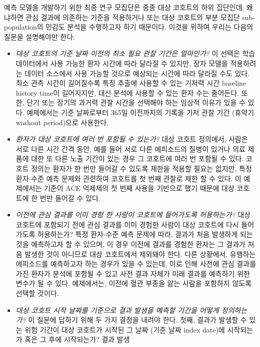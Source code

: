 \documentclass[10.5pt]{book}
\theoremstyle{definition}
\theoremstyle{definition}
\theoremstyle{definition}
\theoremstyle{remark}
\begin{document}
예측 모델을 개발하기 위한 최종 연구 모집단은 종종 대상 코호트의 하위
집단인데, 왜냐하면 관심 결과에 의존하는 기준을 적용하거나 또는 대상
코호트의 부분 모집단 sub-population의 민감도 분석을 수행하고자 하기
때문이다. 이것을 위하여 우리는 다음의 질문을 설명해야만 한다:

\begin{itemize}
\item
  \emph{대상 코호트의 기준 날짜 이전의 최소 필요 관찰 기간은 얼마인가?}
  이 선택은 학습 데이터에서 사용 가능한 환자 시간에 따라 달라질 수
  있지만, 장차 모델을 적용하려는 데이터 소스에서 사용 가능할 것으로
  예상되는 시간에 따라 달라질 수도 있다. 최소 관측 시간이 길어질수록
  특징 추출에 사용할 수 있는 기저력 시간 baseline history time이
  길어지지만, 대신 분석에 사용할 수 있는 환자 수는 줄어든다. 또한, 단기
  또는 장기의 과거력 관찰 시간을 선택해야 하는 임상적 이유가 있을 수
  있다. 예제에서는 기준 날짜로부터 365일 이전까지의 기록을 기저 관찰
  기간 (휴약기 washout period)으로 사용한다.
\item
  \emph{환자가 대상 코호트에 여러 번 포함될 수 있는가?} 대상 코호트
  정의에서, 사람은 서로 다른 시간 간격 동안, 예를 들어 서로 다른
  에피소드의 질병이 있거나 의료 제품에 대한 또 다른 노출 기간이 있는
  경우 그 코호트에 여러 번 포함될 수 있다. 코호트 정의는 환자가 한 번만
  들어갈 수 있도록 제한을 적용할 필요는 없지만, 특정 환자-수준 예측
  문제와 관련하여 코호트를 첫 번째 관찰로 제한 할 수 있다. 이 예제에서는
  기준이 ACE 억제제의 첫 번째 사용을 기반으로 했기 때문에 대상 코호트에
  한 번만 들어갈 수 있다.
\item
  \emph{이전에 관심 결과를 이미 경험 한 사람이 코호트에 들어가도록
  허용하는가?} 대상 코호트에 포함되기 전에 관심 결과를 이미 경험한
  사람이 대상 코호트에 다시 들어가도록 허용하는가? 특정 환자-수준 예측
  문제에 따라, 결과가 처음 발생하게 되는 것을 예측하고자 할 수 있으며,
  이 경우 이전에 결과를 경험한 환자는 그 결과가 처음 발생한 것이
  아니므로 대상 코호트에서 제외돼야 한다. 다른 상황에서, 유행하는
  에피소드를 예측하고자 하는 경우가 있을 수 있는데, 이로 인해 사전에
  관심 결과를 가진 환자가 분석에 포함될 수 있고 사전 결과 자체가 미래
  결과를 예측하기 위한 변수가 될 수 있다. 예제에서는, 이전에 혈관 부종을
  앓는 사람을 포함하지 않도록 선택할 것이다.
\item
  \emph{대상 코호트 시작 날짜를 기준으로 결과 발생을 예측할 기간을
  어떻게 정의하는가?} 이 질문에 답하기 위해 두 가지 결정을 내려야 한다.
  첫째, 결과가 발생할 수 있는 위험 기간이 대상 코호트가 시작된 그 날짜
  (기준 날짜 index date)에 시작되는가 혹은 그 후에 시작되는가? 결과 발생

\end{itemize}
\end{document}
